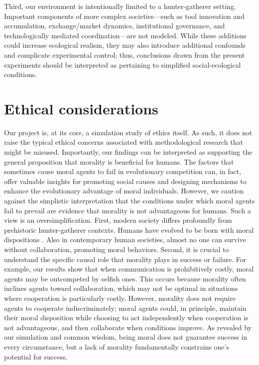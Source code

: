 \documentclass[11pt]{article}
\begin{document}
Third, our environment is intentionally limited to a hunter-gatherer setting. Important components of more complex societies—such as tool innovation and accumulation, exchange/market dynamics, institutional governance, and technologically mediated coordination—are not modeled. While these additions could increase ecological realism, they may also introduce additional confounds and complicate experimental control; thus, conclusions drawn from the present experiments should be interpreted as pertaining to simplified social-ecological conditions.

\section*{Ethical considerations}
Our project is, at its core, a simulation study of ethics itself. As such, it does not raise the typical ethical concerns associated with methodological research that might be misused.
Importantly, our findings can be interpreted as supporting the general proposition that morality is beneficial for humans. The factors that sometimes cause moral agents to fail in evolutionary competition can, in fact, offer valuable insights for promoting social causes and designing mechanisms to enhance the evolutionary advantage of moral individuals.
However, we caution against the simplistic interpretation that the conditions under which moral agents fail to prevail are evidence that morality is not advantageous for humans. Such a view is an oversimplification. First, modern society differs profoundly from prehistoric hunter-gatherer contexts. Humans have evolved to be born with moral dispositions \citep{hamlin2011young, bloom2013just, warneken2006altruistic}. Also in contemporary human societies, almost no one can survive without collaboration, promoting moral behaviors. Second, it is crucial to understand the specific causal role that morality plays in success or failure. For example, our results show that when communication is prohibitively costly, moral agents may be outcompeted by selfish ones. This occurs because morality often inclines agents toward collaboration, which may not be optimal in situations where cooperation is particularly costly. However, morality does not require agents to cooperate indiscriminately; moral agents could, in principle, maintain their moral disposition while choosing to act independently when cooperation is not advantageous, and then collaborate when conditions improve. As revealed by our simulation and common wisdom, being moral does not guarantee success in every circumstance, but a lack of morality fundamentally constrains one's potential for success.
\end{document}
